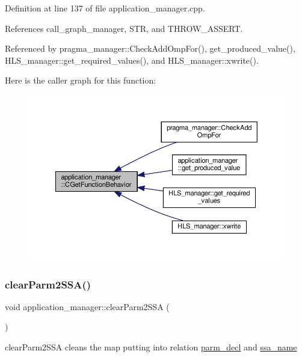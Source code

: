 Definition at line 137 of file application\+\_\+manager.\+cpp.



References call\+\_\+graph\+\_\+manager, S\+TR, and T\+H\+R\+O\+W\+\_\+\+A\+S\+S\+E\+RT.



Referenced by pragma\+\_\+manager\+::\+Check\+Add\+Omp\+For(), get\+\_\+produced\+\_\+value(), H\+L\+S\+\_\+manager\+::get\+\_\+required\+\_\+values(), and H\+L\+S\+\_\+manager\+::xwrite().

Here is the caller graph for this function\+:
\nopagebreak
\begin{figure}[H]
\begin{center}
\leavevmode
\includegraphics[width=350pt]{dc/db5/classapplication__manager_ad201b883f3f2383c4c8256d9ba1177f1_icgraph}
\end{center}
\end{figure}
\mbox{\label{classapplication__manager_ad03a2ed8cf0cdfabcbc8cb903c4d12f1}} 
\subsubsection{\texorpdfstring{clear\+Parm2\+S\+S\+A()}{clearParm2SSA()}}
{\footnotesize\ttfamily void application\+\_\+manager\+::clear\+Parm2\+S\+SA (\begin{DoxyParamCaption}{ }\end{DoxyParamCaption})}



clear\+Parm2\+S\+SA cleans the map putting into relation \hyperlink{structparm__decl}{parm\+\_\+decl} and \hyperlink{structssa__name}{ssa\+\_\+name} 




